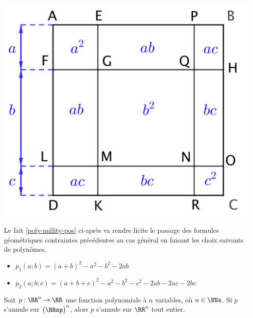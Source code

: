 \begin{center}
	\includegraphics[scale = .7]{(a+b)^3.png}
\end{center}

Le fait \ref{poly-nullity-pos} ci-après va rendre licite le passage des formules géométriques contraintes précédentes au cas général en faisant les choix suivants de polynômes.
%
\begin{itemize}[label=\small\textbullet]
	\item $p_1(a ; b) = (a + b)^2 - a^2 - b^2 - 2 ab$

	\item $p_2(a ; b ; c) = (a + b + c)^2 - a^2 - b^2 - c^2 - 2 ab - 2 ac - 2 bc$
\end{itemize}




\begin{fact} \label{poly-nullity-pos}
	Soit $p: \RR^n \rightarrow \RR$ une fonction polynomiale à $n$ variables, où $n \in \NNs$.
	Si $p$ s'annule sur $\big( \RRsp \big)^n$, alors $p$ s'annule sur $\RR^n$ tout entier. 
\end{fact}


